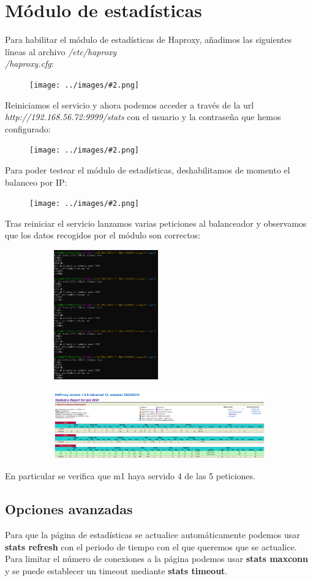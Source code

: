 \documentclass[twoside]{article}
\newcommand{\image}[2]{
\begin{figure}[H]
    \texttt{[image: ../images/\#2.png]}
    \centering
\end{figure}
}
\begin{document}
\section{Módulo de estadísticas}
Para habilitar el módulo de estadísticas de Haproxy, añadimos las siguientes líneas al archivo \textit{/etc/haproxy\\/haproxy.cfg}:
\image{8}{23}
Reiniciamos el servicio y ahora podemos acceder a través de la url \textit{http://192.168.56.72:9999/stats} con el usuario y la contraseña que hemos configurado:
\image{10}{24}
Para poder testear el módulo de estadísticas, deshabilitamos de momento el balanceo por IP:
\image{8}{25}
Tras reiniciar el servicio lanzamos varias peticiones al balanceador y observamos que los datos recogidos por el módulo son correctos:
\begin{figure}[H]
    \centering
    \begin{subfigure}{.3\textwidth}
        \centering
        \includegraphics[width=4.5cm]{../images/26.png}
    \end{subfigure}%
    \begin{subfigure}{.7\textwidth}
        \centering
        \includegraphics[width=10.5cm]{../images/27.png}
    \end{subfigure}
\end{figure}
En particular se verifica que m1 haya servido 4 de las 5 peticiones.
\subsection{Opciones avanzadas}
Para que la página de estadísticas se actualice automáticamente podemos usar \textbf{stats refresh} con el periodo de tiempo con el que queremos que se actualice. Para limitar el número de conexiones a la página podemos usar \textbf{stats maxconn} y se puede establecer un timeout mediante \textbf{stats timeout}. 
\end{document}
